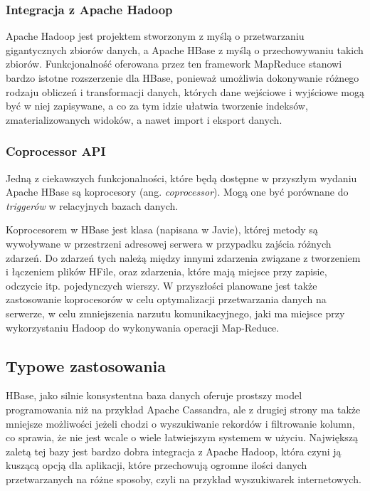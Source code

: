 \subsubsection*{Integracja z Apache Hadoop}

Apache Hadoop jest projektem stworzonym z myślą o przetwarzaniu gigantycznych zbiorów danych, a Apache HBase z myślą o przechowywaniu takich zbiorów.
Funkcjonalność oferowana przez ten framework MapReduce stanowi bardzo istotne rozszerzenie dla HBase, ponieważ umożliwia dokonywanie różnego rodzaju obliczeń i transformacji danych, których dane wejściowe i wyjściowe mogą być w niej zapisywane, a co za tym idzie ułatwia tworzenie indeksów, zmaterializowanych widoków, a nawet import i eksport danych.

\subsubsection*{Coprocessor API}

Jedną z ciekawszych funkcjonalności, które będą dostępne w przyszłym wydaniu Apache HBase są koprocesory (ang. \emph{coprocessor}).
Mogą one być porównane do \emph{triggerów} w relacyjnych bazach danych.

Koprocesorem w HBase jest klasa (napisana w Javie), której metody są wywoływane w przestrzeni adresowej serwera w przypadku zajścia różnych zdarzeń.
Do zdarzeń tych należą między innymi zdarzenia związane z tworzeniem i łączeniem plików HFile, oraz zdarzenia, które mają miejsce przy zapisie, odczycie itp. pojedynczych wierszy.
W przyszłości planowane jest także zastosowanie koprocesorów w celu optymalizacji przetwarzania danych na serwerze, w celu zmniejszenia narzutu komunikacyjnego, jaki ma miejsce przy wykorzystaniu Hadoop do wykonywania operacji Map-Reduce.

\subsection*{Typowe zastosowania}

HBase, jako silnie konsystentna baza danych oferuje prostszy model programowania niż na przykład Apache Cassandra, ale z drugiej strony ma także mniejsze możliwości jeżeli chodzi o wyszukiwanie rekordów i filtrowanie kolumn, co sprawia, że nie jest wcale o wiele łatwiejszym systemem w użyciu.
Największą zaletą tej bazy jest bardzo dobra integracja z Apache Hadoop, która czyni ją kuszącą opcją dla aplikacji, które przechowują ogromne ilości danych przetwarzanych na różne sposoby, czyli na przykład wyszukiwarek internetowych.

